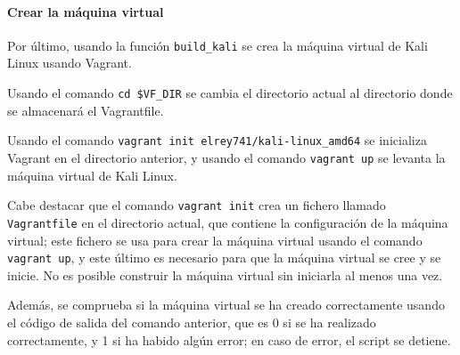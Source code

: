 \begin{appendices}
                \paragraph{Crear la máquina virtual}
                
                    Por último, usando la función \texttt{build\_kali} se crea la máquina virtual de Kali Linux usando Vagrant.

                    Usando el comando \texttt{cd \$VF\_DIR} se cambia el directorio actual al directorio donde se almacenará el Vagrantfile.
                    
                    Usando el comando \texttt{vagrant init elrey741/kali-linux\_amd64} se inicializa Vagrant en el directorio anterior, y usando el comando \texttt{vagrant up} se levanta la máquina virtual de Kali Linux.

                    Cabe destacar que el comando \texttt{vagrant init} crea un fichero llamado \texttt{Vagrantfile} en el directorio actual, que contiene la configuración de la máquina virtual; este fichero se usa para crear la máquina virtual usando el comando \texttt{vagrant up}, y este último es necesario para que la máquina virtual se cree y se inicie. No es posible construir la máquina virtual sin iniciarla al menos una vez.

                    Además, se comprueba si la máquina virtual se ha creado correctamente usando el código de salida del comando anterior, que es 0 si se ha realizado correctamente, y 1 si ha habido algún error; en caso de error, el script se detiene.

                \newpage
                
\end{appendices}

